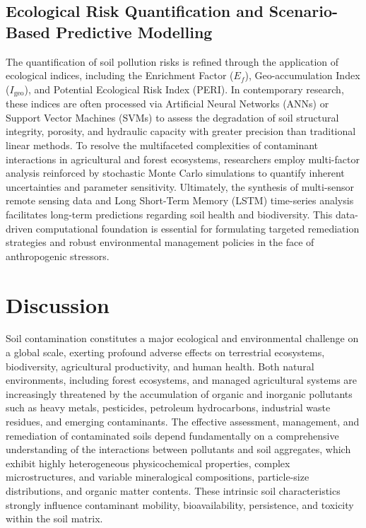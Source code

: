 \documentclass[sn-mathphys-num]{sn-jnl}
\begin{document}
\subsection{Ecological Risk Quantification and Scenario-Based Predictive
    Modelling}\label{sec4.2}

The quantification of soil pollution risks is refined through the application
of ecological indices, including the Enrichment Factor ($E_f$),
Geo-accumulation Index ($I_{\text{geo}}$), and Potential Ecological Risk
Index (PERI). In contemporary research, these indices are often processed via
Artificial Neural Networks (ANNs) or Support Vector Machines (SVMs) to assess
the degradation of soil structural integrity, porosity, and hydraulic capacity
with greater precision than traditional linear methods. To resolve the
multifaceted complexities of contaminant interactions in agricultural and
forest ecosystems, researchers employ multi-factor analysis reinforced by
stochastic Monte Carlo simulations to quantify inherent uncertainties and
parameter sensitivity. Ultimately, the synthesis of multi-sensor remote
sensing data and Long Short-Term Memory (LSTM) time-series analysis
facilitates long-term predictions regarding soil health and biodiversity. This
data-driven computational foundation is essential for formulating targeted
remediation strategies and robust environmental management policies in the
face of anthropogenic stressors.

\section{Discussion}\label{sec5}

Soil contamination constitutes a major ecological and environmental challenge
on a global scale, exerting profound adverse effects on terrestrial
ecosystems, biodiversity, agricultural productivity, and human health. Both
natural environments, including forest ecosystems, and managed agricultural
systems are increasingly threatened by the accumulation of organic and
inorganic pollutants such as heavy metals, pesticides, petroleum hydrocarbons,
industrial waste residues, and emerging contaminants. The effective assessment,
management, and remediation of contaminated soils depend fundamentally on a
comprehensive understanding of the interactions between pollutants and soil
aggregates, which exhibit highly heterogeneous physicochemical properties,
complex microstructures, and variable mineralogical compositions, particle-size
distributions, and organic matter contents. These intrinsic soil
characteristics strongly influence contaminant mobility, bioavailability,
persistence, and toxicity within the soil matrix.
\end{document}
